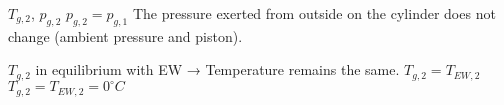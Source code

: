 \( T_{g,2} \), \( p_{g,2} \)  
\( p_{g,2} = p_{g,1} \)  
The pressure exerted from outside on the cylinder does not change (ambient pressure and piston).  

\( T_{g,2} \) in equilibrium with EW → Temperature remains the same.  
\( T_{g,2} = T_{EW,2} \)  
\( T_{g,2} = T_{EW,2} = 0^\circ C \)